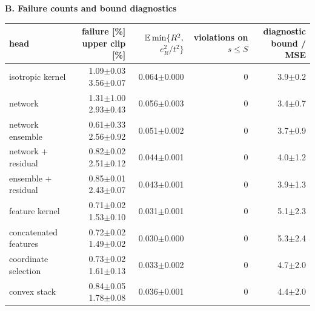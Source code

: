 \par\bigskip\textbf{B. Failure counts and bound diagnostics}\par\medskip
{\fontsize{9}{11}\selectfont
\setlength{\tabcolsep}{3pt}
\begin{tabular}{lrrrr}
\toprule
head & \thead{failure [\%]\\upper clip [\%]} & \thead{$\E\min\{R^2,$\\$e_R^2/t^2\}$} & \thead{violations\\on $s\le S$} & \thead{diagnostic\\bound / MSE} \\
\midrule
isotropic kernel & \shortstack{1.09$\pm$0.03\\3.56$\pm$0.07} & 0.064$\pm$0.000 & 0 & 3.9$\pm$0.2 \\
network & \shortstack{1.31$\pm$1.00\\2.93$\pm$0.43} & 0.056$\pm$0.003 & 0 & 3.4$\pm$0.7 \\
network ensemble & \shortstack{0.61$\pm$0.33\\2.56$\pm$0.92} & 0.051$\pm$0.002 & 0 & 3.7$\pm$0.9 \\
network + residual & \shortstack{0.82$\pm$0.02\\2.51$\pm$0.12} & 0.044$\pm$0.001 & 0 & 4.0$\pm$1.2 \\
ensemble + residual & \shortstack{0.85$\pm$0.01\\2.43$\pm$0.07} & 0.043$\pm$0.001 & 0 & 3.9$\pm$1.3 \\
feature kernel & \shortstack{0.71$\pm$0.02\\1.53$\pm$0.10} & 0.031$\pm$0.001 & 0 & 5.1$\pm$2.3 \\
concatenated features & \shortstack{0.72$\pm$0.02\\1.49$\pm$0.02} & 0.030$\pm$0.000 & 0 & 5.3$\pm$2.4 \\
coordinate selection & \shortstack{0.73$\pm$0.02\\1.61$\pm$0.13} & 0.033$\pm$0.002 & 0 & 4.7$\pm$2.0 \\
convex stack & \shortstack{0.84$\pm$0.05\\1.78$\pm$0.08} & 0.036$\pm$0.001 & 0 & 4.4$\pm$2.0 \\
\bottomrule
\end{tabular}}
